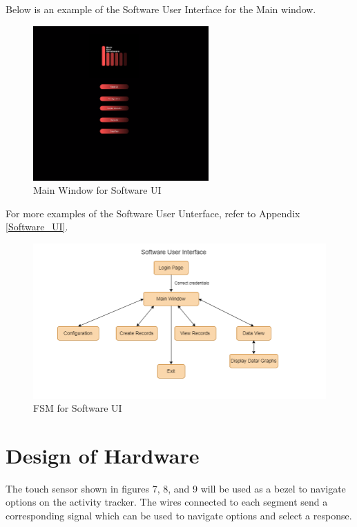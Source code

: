 \documentclass[12pt, titlepage]{article}
\begin{document}
Below is an example of the Software User Interface for the Main window.
\begin{figure}[H]
	\begin{center}
		 \includegraphics[width=0.6\textwidth]{MainWindow}
		\caption{Main Window for Software UI}
		\label{MainWindow} 
	\end{center}
\end{figure}

For more examples of the Software User Unterface, refer to Appendix \ref{Software_UI}.

\begin{figure}[H]
	\begin{center}
		 \includegraphics[width=1\textwidth]{SoftwareUI_FSM}
		\caption{FSM for Software UI}
		\label{SoftwareUI_FSM} 
	\end{center}
\end{figure}

\section{Design of Hardware}

The touch sensor shown in figures 7, 8, and 9 will be used as a bezel to navigate options on the activity tracker. The wires connected to each segment send a corresponding signal which can be used to navigate options and select a response.
\end{document}
